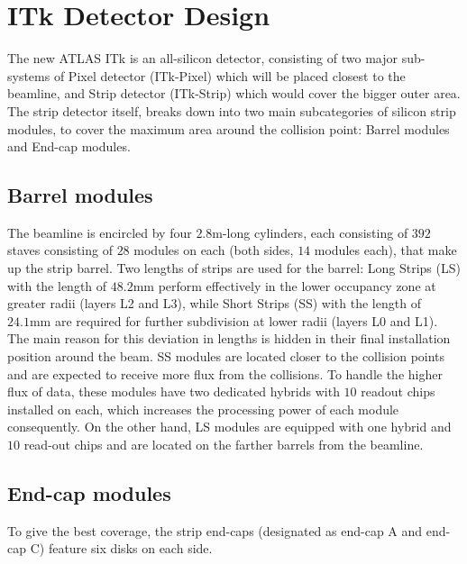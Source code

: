 \section{ITk Detector Design}
The new ATLAS ITk is an all-silicon detector, consisting of two major sub-systems of Pixel detector (ITk-Pixel) which will be placed closest to the beamline, and Strip detector (ITk-Strip) which would cover the bigger outer area. The strip detector itself, breaks down into two main subcategories of silicon strip modules, to cover the maximum area around the collision point: Barrel modules and End-cap modules.

\subsection{Barrel modules}
The beamline is encircled by four $2.8 \si{\meter}$-long cylinders, each consisting of $392$ staves consisting of $28$ modules on each (both sides, $14$ modules each), that make up the strip barrel. Two lengths of strips are used for the barrel: Long Strips (LS) with the length of $48.2  \si{\milli\meter}$ perform effectively in the lower occupancy zone at greater radii (layers L2 and L3), while Short Strips (SS) with the length of $24.1  \si{\milli\meter}$ are required for further subdivision at lower radii (layers L0 and L1). The main reason for this deviation in lengths is hidden in their final installation position around the beam. SS modules are located closer to the collision points and are expected to receive more flux from the collisions. To handle the higher flux of data, these modules have two dedicated hybrids with $10$ readout chips installed on each, which increases the processing power of each module consequently. On the other hand, LS modules are equipped with one hybrid and $10$ read-out chips and are located on the farther barrels from the beamline. 

\subsection{End-cap modules}
To give the best coverage, the strip end-caps (designated as end-cap A and end-cap C) feature six disks on each side.\\
 
